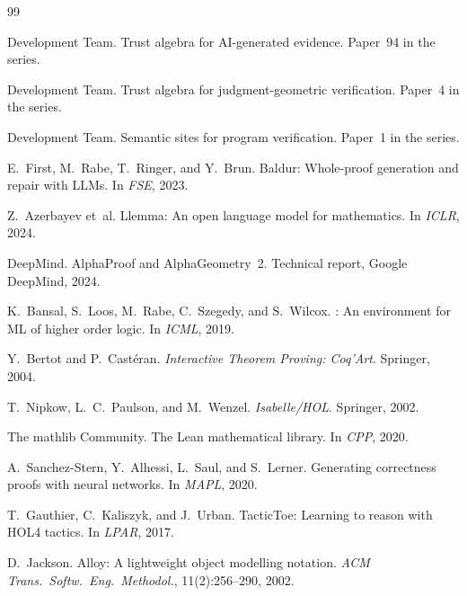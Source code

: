 \documentclass[11pt]{article}
\begin{document}

\begin{thebibliography}{99}

\JuGeo{} Development Team.
\newblock Trust algebra for AI-generated evidence.
\newblock Paper~94 in the \JuGeo{} series.

\JuGeo{} Development Team.
\newblock Trust algebra for judgment-geometric verification.
\newblock Paper~4 in the \JuGeo{} series.

\JuGeo{} Development Team.
\newblock Semantic sites for program verification.
\newblock Paper~1 in the \JuGeo{} series.

E.~First, M.~Rabe, T.~Ringer, and Y.~Brun.
\newblock Baldur: Whole-proof generation and repair with LLMs.
\newblock In \emph{FSE}, 2023.

Z.~Azerbayev et~al.
\newblock Llemma: An open language model for mathematics.
\newblock In \emph{ICLR}, 2024.

DeepMind.
\newblock AlphaProof and AlphaGeometry~2.
\newblock Technical report, Google DeepMind, 2024.

K.~Bansal, S.~Loos, M.~Rabe, C.~Szegedy, and S.~Wilcox.
: An environment for ML of higher order logic.
\newblock In \emph{ICML}, 2019.

Y.~Bertot and P.~Cast{\'e}ran.
\newblock \emph{Interactive Theorem Proving: Coq'Art}.
\newblock Springer, 2004.

T.~Nipkow, L.~C.~Paulson, and M.~Wenzel.
\newblock \emph{Isabelle/HOL}.
\newblock Springer, 2002.

The mathlib Community.
\newblock The {L}ean mathematical library.
\newblock In \emph{CPP}, 2020.

A.~Sanchez-Stern, Y.~Alhessi, L.~Saul, and S.~Lerner.
\newblock Generating correctness proofs with neural networks.
\newblock In \emph{MAPL}, 2020.

T.~Gauthier, C.~Kaliszyk, and J.~Urban.
\newblock TacticToe: Learning to reason with HOL4 tactics.
\newblock In \emph{LPAR}, 2017.

D.~Jackson.
\newblock Alloy: A lightweight object modelling notation.
\newblock \emph{ACM Trans.~Softw.~Eng.~Methodol.}, 11(2):256--290, 2002.


\end{thebibliography}
\end{document}
